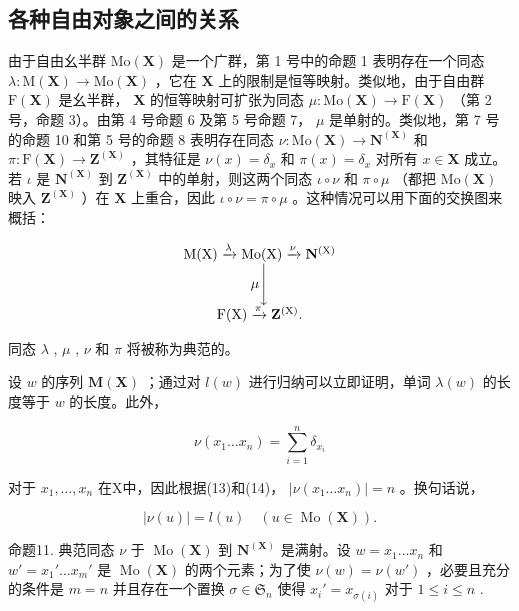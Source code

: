 \subsection{各种自由对象之间的关系}

由于自由幺半群 \(\mathrm{Mo}(\mathbf{X})\) 是一个广群，第 1 号中的命题 1 表明存在一个同态 \(\lambda: \mathrm{M}(\mathbf{X}) \to \mathrm{Mo}(\mathbf{X})\) ，它在 \(\mathbf{X}\) 上的限制是恒等映射。类似地，由于自由群 \(\mathrm{F}(\mathbf{X})\) 是幺半群， \(\mathbf{X}\) 的恒等映射可扩张为同态 \(\mu: \mathrm{Mo}(\mathbf{X}) \to \mathrm{F}(\mathbf{X})\) （第 2 号，命题 3）。由第 4 号命题 6 及第 5 号命题 7， \(\mu\) 是单射的。类似地，第 7 号的命题 10 和第 5 号的命题 8 表明存在同态 \(\nu: \mathrm{Mo}(\mathbf{X}) \to \mathbf{N}^{(\mathbf{X})}\) 和 \(\pi: \mathrm{F}(\mathbf{X}) \to \mathbf{Z}^{(\mathbf{X})}\) ，其特征是 \(\nu(x) = \delta_x\) 和 \(\pi(x) = \delta_x\) 对所有 \(x \in \mathbf{X}\) 成立。若 \(\iota\) 是 \(\mathbf{N}^{(\mathbf{X})}\) 到 \(\mathbf{Z}^{(\mathbf{X})}\) 中的单射，则这两个同态 \(\iota \circ \nu\) 和 \(\pi \circ \mu\) （都把 \(\mathrm{Mo}(\mathbf{X})\) 映入 \(\mathbf{Z}^{(\mathbf{X})}\) ）在 \(\mathbf{X}\) 上重合，因此 \(\iota \circ \nu = \pi \circ \mu\) 。这种情况可以用下面的交换图来概括：

\[
\begin{array}{c} \mathrm{M} (\mathrm{X}) \xrightarrow {\lambda} \mathrm{Mo} (\mathrm{X}) \xrightarrow {\nu} \mathbf {N} ^ {(\mathrm{X})} \\ \mu \Biggl \downarrow \\ \mathrm{F} (\mathrm{X}) \xrightarrow {\pi} \mathbf {Z} ^ {(\mathrm{X})}. \end{array}
\]

同态 \(\lambda\) , \(\mu\) , \(\nu\) 和 \(\pi\) 将被称为典范的。

设 \(w\) 的序列 \(\mathbf{M}(\mathbf{X})\) ；通过对 \(l(w)\) 进行归纳可以立即证明，单词 \(\lambda(w)\) 的长度等于 \(w\) 的长度。此外，

\[
\nu (x _ {1} \dots x _ {n}) = \sum_ {i = 1} ^ {n} \delta_ {x _ {i}}\tag{21}
\]

对于 \(x_1, \ldots, x_n\) 在X中，因此根据(13)和(14)， \(|\nu(x_1 \ldots x_n)| = n\) 。换句话说，

\[
\left| \nu (u) \right| = l (u) \quad (u \in \operatorname{Mo} (\mathbf {X})).\tag{22}
\]

命题11. 典范同态 \(\nu\) 于 \(\operatorname{Mo}(\mathbf{X})\) 到 \(\mathbf{N}^{(\mathbf{X})}\) 是满射。设 \(w = x_1 \ldots x_n\) 和 \(w' = x_1' \ldots x_m'\) 是 \(\operatorname{Mo}(\mathbf{X})\) 的两个元素；为了使 \(\nu(w) = \nu(w')\) ，必要且充分的条件是 \(m = n\) 并且存在一个置换 \(\sigma \in \mathfrak{S}_n\) 使得 \(x_i' = x_{\sigma(i)}\) 对于 \(1 \leqslant i \leqslant n\) .

